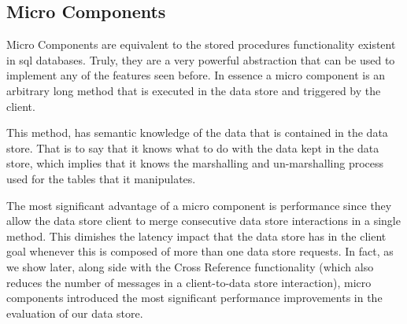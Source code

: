 



\subsection{Micro Components}
\label{sec:heimdall:micro-components}
Micro Components are equivalent to the stored procedures functionality existent in \gls{sql} databases. 
Truly,  they are a very powerful abstraction that can be used to implement any of the features seen before. 
In essence a micro component is an arbitrary long  method that is executed in the data store and triggered by the client. 


This method, has semantic knowledge of the data that is contained in the data store. 
That is to say that it knows what to do with the data kept in the data store, which implies that it knows the marshalling and un-marshalling process used for the tables that it manipulates.

The most significant advantage of a micro component is performance since they allow the data store client to merge consecutive data store interactions in a single method.
This dimishes the latency impact that the data store has in the client goal whenever this is composed of more than one data store requests. 
In fact, as we show later, along side with the Cross Reference functionality (which also reduces the number of messages in a client-to-data store interaction), micro components  introduced the most significant performance improvements in the evaluation of our data store. 

